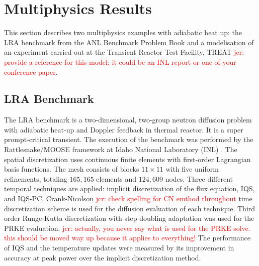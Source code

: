 \documentclass{elsarticle}
\newcommand{\iqspc}{IQS-PC\xspace}
\newcommand{\jcr}[1]{\textcolor{red}{jcr: #1}}
\begin{document}
\section{Multiphysics Results}

This section describes two multiphysics examples with adiabatic heat up: the LRA benchmark from the  ANL Benchmark Problem Book \cite{ANL_BPB} 
and a modelisation of an experiment carried out at the Transient Reactor Test Facility, TREAT \jcr{provide a reference for this model; it could be an INL report or one of your conference paper}. 

\subsection{LRA Benchmark}

The LRA benchmark is a two-dimensional, two-group neutron diffusion problem with adiabatic heat-up 
and Doppler feedback in thermal reactor.  It is a super prompt-critical transient. 
The execution of the benchmark was performed by the Rattlesnake/MOOSE framework at Idaho National Laboratory (INL) \cite{wang2013}.  The spatial discretization uses continuous finite elements
with first-order Lagrangian basis functions. The mesh consists of blocks $11\times 11$ with five uniform refinements, totaling $165,165$ elements and $124,609$ nodes. Three different temporal techniques are
applied: implicit discretization of the flux equation, IQS, and \iqspc. Crank-Nicolson \jcr{check spelling for CN emthod throughout} time discretization scheme is used for the diffusion evaluation of each technique.  
Third order Runge-Kutta discretization with step doubling adaptation was used for the PRKE evaluation.  \jcr{actually, you never say what is used for the PRKE solve. this should be moved way up because it applies to everything!}
The performance of IQS and the temperature updates were measured by its improvement in accuracy at peak power over the implicit discretization method.
\end{document}

